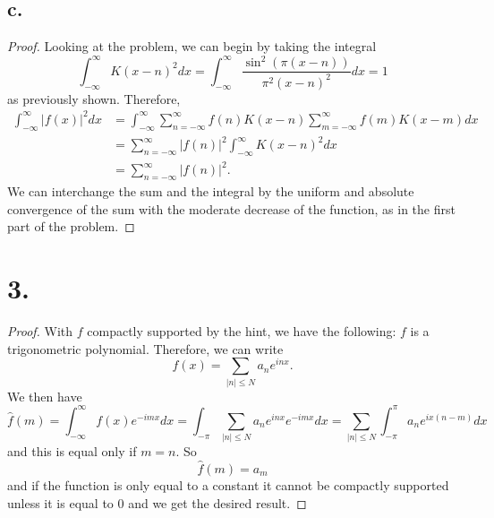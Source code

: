 \documentclass{article}
\begin{document}
\subsection*{c.}
\begin{proof}
    Looking at the problem, we can begin by taking the integral
    \[
    \int_{-\infty}^{\infty}K(x - n)^2dx = \int_{-\infty}^{\infty}\frac{\sin^2(\pi(x - n))}{\pi^2(x - n)^2 }dx = 1    
    \]
    as previously shown. Therefore,  
    \begin{align*}
        \int_{-\infty}^{\infty}|f(x)|^2dx &= \int_{-\infty}^{\infty} \sum\limits_{n = -\infty}^{\infty}f(n)K(x - n)\sum\limits_{m = -\infty}^{\infty}f(m)K(x - m) dx \\
        &= \sum\limits_{n = -\infty}^{\infty}|f(n)|^2\int_{-\infty}^{\infty}K(x - n)^2dx \\
        &= \sum\limits_{n = -\infty}^{\infty}|f(n)|^2.
    \end{align*}
    We can interchange the sum and the integral by the uniform and absolute convergence of the sum with the moderate decrease of the function, as in the first part of the problem.  
\end{proof}


\section*{3.}
\begin{proof} 

    With $f$ compactly supported by the hint, we have the following: $f$ is a trigonometric polynomial. Therefore, we can write 
    \[
    f(x) = \sum\limits_{|n| \leq N} a_ne^{inx}.    
    \]
    We then have
    \[
    \hat{f}(m) = \int_{-\infty}^{\infty}f(x)e^{-imx} dx = \int_{-\pi} \sum\limits_{|n| \leq N}a_n e^{inx}e^{-imx}dx = \sum\limits_{|n|\leq N}\int_{-\pi}^{\pi}a_ne^{ix(n - m)}dx
    \]
    and this is equal only if $m = n$. So 
    \[
    \hat{f}(m) = a_m    
    \]
    and if the function is only equal to a constant it cannot be compactly supported unless it is equal to $0$ and we get the desired result. 
\end{proof}
\end{document}

